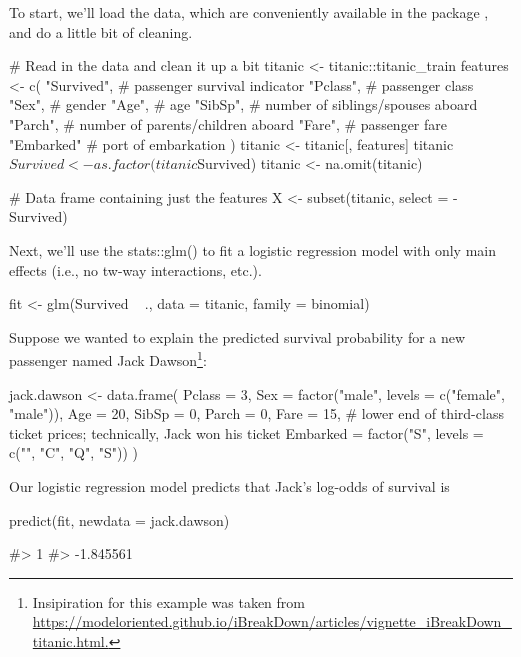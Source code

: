 To start, we'll load the data, which are conveniently available in the
 package \citep{R-titanic}, and do a little bit of
cleaning.

\begin{Schunk}
\begin{Sinput}
# Read in the data and clean it up a bit
titanic <- titanic::titanic_train
features <- c(
  "Survived",  # passenger survival indicator
  "Pclass",    # passenger class
  "Sex",       # gender
  "Age",       # age
  "SibSp",     # number of siblings/spouses aboard
  "Parch",     # number of parents/children aboard
  "Fare",      # passenger fare
  "Embarked"   # port of embarkation
)
titanic <- titanic[, features]
titanic$Survived <- as.factor(titanic$Survived)
titanic <- na.omit(titanic)

# Data frame containing just the features
X <- subset(titanic, select = -Survived)
\end{Sinput}
\end{Schunk}

Next, we'll use the stats::glm() to fit a logistic regression model with
only main effects (i.e., no tw-way interactions, etc.).

\begin{Schunk}
\begin{Sinput}
fit <- glm(Survived ~ ., data = titanic, family = binomial)
\end{Sinput}
\end{Schunk}

Suppose we wanted to explain the predicted survival probability for a
new passenger named Jack
Dawson\footnote{Insipiration for this example was taken from \url{https://modeloriented.github.io/iBreakDown/articles/vignette_iBreakDown_titanic.html.}}:

\begin{Schunk}
\begin{Sinput}
jack.dawson <- data.frame(
  Pclass = 3,
  Sex = factor("male", levels = c("female", "male")),
  Age = 20,
  SibSp = 0,
  Parch = 0,
  Fare = 15,  # lower end of third-class ticket prices; technically, Jack won his ticket
  Embarked = factor("S", levels = c("", "C", "Q", "S"))
)
\end{Sinput}
\end{Schunk}

Our logistic regression model predicts that Jack's log-odds of survival
is

\begin{Schunk}
\begin{Sinput}
predict(fit, newdata = jack.dawson)
\end{Sinput}
\begin{Soutput}
#>         1 
#> -1.845561
\end{Soutput}
\end{Schunk}

